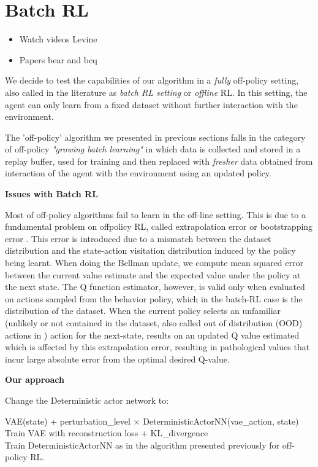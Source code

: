 \chapter{Batch RL}
\begin{itemize}
    \item Watch videos Levine
    \item Papers bear and bcq
    
\end{itemize}

We decide to test the capabilities of our algorithm in a \textit{fully} off-policy setting, 
also called in the literature as \textit{batch RL setting} or \textit{offline} RL. In this setting, the agent 
can only learn from a fixed dataset without further interaction with the environment.


The 'off-policy' algorithm we presented in previous sections falls in the category of 
off-policy \textit{"growing batch learning"} in which data is collected and stored in a replay buffer,
used for training and then replaced with \textit{fresher} data obtained from interaction of the agent with the
environment using an updated policy.

\textbf{Issues with Batch RL}

Most of off-policy algorithms fail to learn in the off-line setting. 
This is due to a fundamental problem on offpolicy RL, called extrapolation error \citep{Fujimoto2019} or 
bootstrapping error \citep{Kumar2019}. This error is introduced due to a mismatch
between the dataset distribution and the state-action visitation distribution induced by the
policy being learnt.
When doing the Bellman update, we compute mean squared error between the current value estimate and
the expected value under the policy at the next state.
The Q function estimator, however, is valid only when evaluated on actions sampled from the behavior policy,
which in the batch-RL case is the distribution of the dataset.
When the current policy selects an unfamiliar (unlikely or not contained in the dataset, 
also called out of distribution (OOD) actions in \citep{Kumar2019} ) action for the next-state,
results on an updated Q value estimated which is affected by this extrapolation error,
resulting in pathological values that incur large absolute error from the optimal desired Q-value.


\textbf{Our approach}

Change the Deterministic actor network to:

VAE(state) + perturbation\_level $\times$ DeterministicActorNN(vae\_action, state)\\
Train VAE with reconstruction loss + KL\_divergence\\
Train DeterministicActorNN as in the algorithm presented previously for off-policy RL.